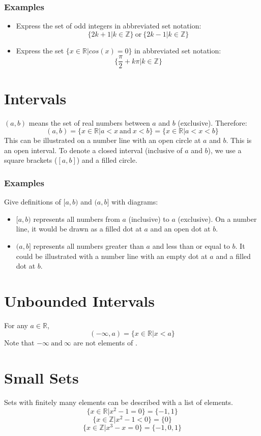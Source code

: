 \documentclass[12pt]{report}
\newcommand{\Z}{\mathbb{Z}}
\newcommand{\R}{\mathbb{R}}
\begin{document}
\begin{flushleft}
\subsubsection*{Examples}

\begin{itemize}
\item Express the set of odd integers in abbreviated set notation: 
\[\{2k + 1 | k \in \Z\} \:\mathrm{or}\: \{2k - 1 | k \in \Z\}\]
\item Express the set \(\{x \in \R | cos(x) = 0\}\) in abbreviated set notation: 
\[\{\frac{\pi}{2} + k\pi | k \in \Z\}\]
\end{itemize}


\section*{Intervals}
\((a, b)\) means the set of real numbers between \(a\) and \(b\) (exclusive). Therefore:
\[(a, b) = \{ x \in \R | a < x \:\mathrm{and}\: x < b\} = \{ x \in \R | a < x < b\} \]
This can be illustrated on a number line with an open circle at \(a\) and \(b\). This is an open interval.
To denote a closed interval (inclusive of \(a\) and \(b\)), we use a square brackets (\([a, b]\)) and a filled circle.

\subsubsection*{Examples}
Give definitions of \([a, b)\) and \((a, b]\) with diagrams:
\begin{itemize}
\item \([a, b)\) represents all numbers from \(a\) (inclusive) to \(a\) (exclusive). On a number line, it would be drawn as a filled dot at \(a\) and an open dot at \(b\).
\item \((a, b]\) represents all numbers greater than \(a\) and less than or equal to \(b\). It could be illustrated with a number line with an empty dot at \(a\) and a filled dot at \(b\).
\end{itemize}


\section*{Unbounded Intervals}
For any \(a \in \R\), 
\[(-\infty, a) = \{x \in \R | x < a\}\]
Note that \(-\infty \:\mathrm{and}\: \infty\) are not elements of .

\section*{Small Sets}
Sets with finitely many elements can be described with a list of elements.
\[\{x \in \R | x^2 - 1 = 0\} = \{-1, 1\}\]
\[\{x \in \Z | x^2 - 1 < 0\} = \{0\}\]
\[\{x \in \Z | x^3 - x = 0\} = \{-1, 0, 1\}\]


\end{flushleft}
\end{document}
